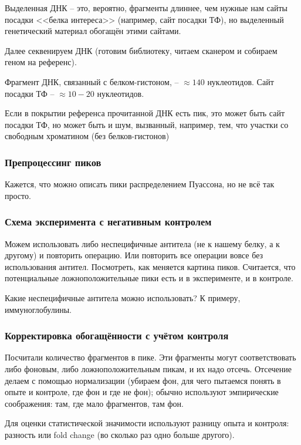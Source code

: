 \documentclass[main.tex]{subfiles}
\begin{document}
Выделенная ДНК -- это, вероятно, фрагменты длиннее, чем нужные нам сайты посадки <<белка интереса>> (например, сайт посадки ТФ), но выделенный генетический материал обогащён этими сайтами.

Далее секвенируем ДНК (готовим библиотеку, читаем сканером и собираем геном на референс).

Фрагмент ДНК, связанный с белком-гистоном, -- $ \approx 140 $ нуклеотидов.
Сайт посадки ТФ -- $ \approx 10-20 $ нуклеотидов.

Если в покрытии референса прочитанной ДНК есть пик, это может быть сайт посадки ТФ, но может быть и шум, вызванный, например, тем, что участки со свободным хроматином (без белков-гистонов)

\subsubsection{Препроцессинг пиков}


Кажется, что можно описать пики распределением Пуассона, но не всё так просто.

\subsubsection{ Схема эксперимента с негативным контролем }

Можем использовать либо неспецифичные антитела (не к нашему белку, а к другому) и повторить операцию.
Или повторить все операции вовсе без использования антител.
Посмотреть, как меняется картина пиков.
Считается, что потенциальные ложноположительные пики есть и в эксперименте, и в контроле.

Какие неспецифичные антитела можно использовать?
К примеру, иммуноглобулины.

\subsubsection{Корректировка обогащённости с учётом контроля}

Посчитали количество фрагментов в пике.
Эти фрагменты могут соответствовать либо фоновым, либо ложноположительным пикам, и их надо отсечь.
Отсечение делаем с помощью нормализации (убираем фон, для чего пытаемся понять в опыте и контроле, где фон и где не фон); обычно используют эмпирические соображения: там, где мало фрагментов, там фон.

Для оценки статистической значимости используют разницу опыта и контроля: разность или fold change (во сколько раз одно больше другого).
\end{document}
